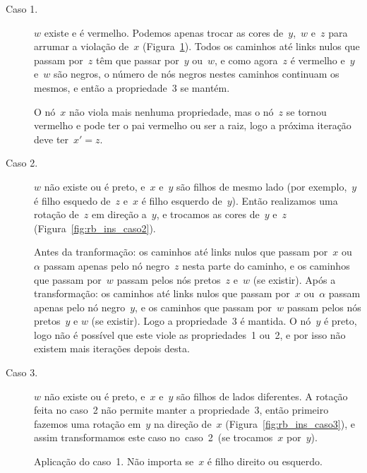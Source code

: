\documentclass[main.tex]{subfiles}
\begin{document}
\begin{description}
	\item[Caso 1.] $w$ existe e é vermelho. Podemos apenas trocar as cores de~$y$,~$w$ e~$z$ para arrumar a violação de~$x$ (Figura~\ref{fig:rb_ins_caso1}). Todos os caminhos até links nulos que passam por~$z$ têm que passar por~$y$ ou~$w$, e como agora~$z$ é vermelho e~$y$ e~$w$ são negros, o número de nós negros nestes caminhos continuam os mesmos, e então a propriedade~3 se mantém.

	O nó~$x$ não viola mais nenhuma propriedade, mas o nó~$z$ se tornou vermelho e pode ter o pai vermelho ou ser a raiz, logo a próxima iteração deve ter~$x' = z$.

	\item[Caso 2.] $w$ não existe ou é preto, e~$x$ e~$y$ são filhos de mesmo lado (por exemplo,~$y$ é filho esquedo de~$z$ e~$x$ é filho esquerdo de~$y$). Então realizamos uma rotação de~$z$ em direção a~$y$, e trocamos as cores de~$y$ e~$z$ (Figura~\ref{fig:rb_ins_caso2}).

	Antes da tranformação: os caminhos até links nulos que passam por~$x$ ou~$\alpha$ passam apenas pelo nó negro~$z$ nesta parte do caminho, e os caminhos que passam por~$w$ passam pelos nós pretos~$z$ e~$w$ (se existir). Após a transformação: os caminhos até links nulos que passam por~$x$ ou~$\alpha$ passam apenas pelo nó negro~$y$, e os caminhos que passam por~$w$ passam pelos nós pretos~$y$ e $w$ (se existir). Logo a propriedade~3 é mantida. O nó~$y$ é preto, logo não é possível que este viole as propriedades~1 ou~2, e por isso não existem mais iterações depois desta.

	\item[Caso 3.] $w$ não existe ou é preto, e~$x$ e~$y$ são filhos de lados diferentes. A rotação feita no caso~2 não permite manter a propriedade~3, então primeiro fazemos uma rotação em~$y$ na direção de~$x$ (Figura~\ref{fig:rb_ins_caso3}), e assim transformamos este caso no~caso~2~(se trocamos~$x$ por~$y$).

\end{description}

\begin{figure}
\centering
{}
\caption{Aplicação do caso~1. Não importa se~$x$ é filho direito ou esquerdo.} \label{fig:rb_ins_caso1}
\end{figure}
\end{document}
